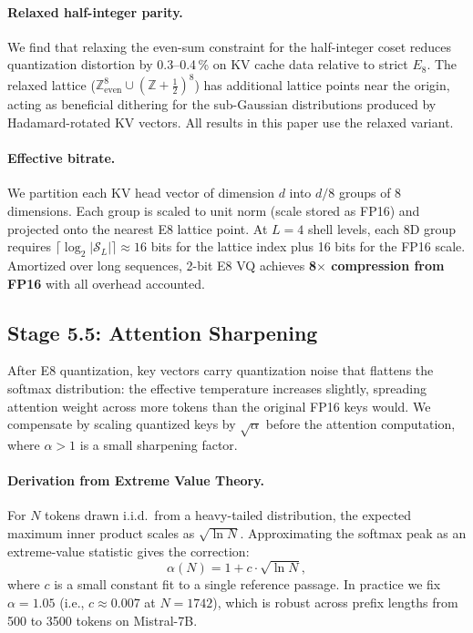 \documentclass{article}
\begin{document}
\paragraph{Relaxed half-integer parity.}
We find that relaxing the even-sum constraint for the half-integer coset
reduces quantization distortion by 0.3--0.4\,\% on KV cache data relative to
strict $E_8$. The relaxed lattice ($\mathbb{Z}^8_\text{even} \cup
(\mathbb{Z}+\tfrac{1}{2})^8$) has additional lattice points near the origin,
acting as beneficial dithering for the sub-Gaussian distributions produced by
Hadamard-rotated KV vectors. All results in this paper use the relaxed variant.

\paragraph{Effective bitrate.}
We partition each KV head vector of dimension $d$ into $d/8$ groups of 8
dimensions. Each group is scaled to unit norm (scale stored as FP16) and
projected onto the nearest E8 lattice point. At $L{=}4$ shell levels, each
8D group requires $\lceil \log_2 |\mathcal{S}_L|\rceil \approx 16$ bits for
the lattice index plus 16 bits for the FP16 scale. Amortized over long
sequences, 2-bit E8 VQ achieves \textbf{8$\times$ compression from FP16}
with all overhead accounted.

\subsection{Stage 5.5: Attention Sharpening}
\label{sec:sharpening}

After E8 quantization, key vectors carry quantization noise that flattens the
softmax distribution: the effective temperature increases slightly, spreading
attention weight across more tokens than the original FP16 keys would.
We compensate by scaling quantized keys by $\sqrt{\alpha}$ before the attention
computation, where $\alpha > 1$ is a small sharpening factor.

\paragraph{Derivation from Extreme Value Theory.}
For $N$ tokens drawn i.i.d.\ from a heavy-tailed distribution, the expected
maximum inner product scales as $\sqrt{\ln N}$.  Approximating the softmax peak
as an extreme-value statistic gives the correction:
\begin{equation}
  \alpha(N) = 1 + c \cdot \sqrt{\ln N},
  \label{eq:sharpening}
\end{equation}
where $c$ is a small constant fit to a single reference passage.  In practice
we fix $\alpha = 1.05$ (i.e., $c \approx 0.007$ at $N{=}1742$), which is robust
across prefix lengths from 500 to 3500 tokens on Mistral-7B.
\end{document}
